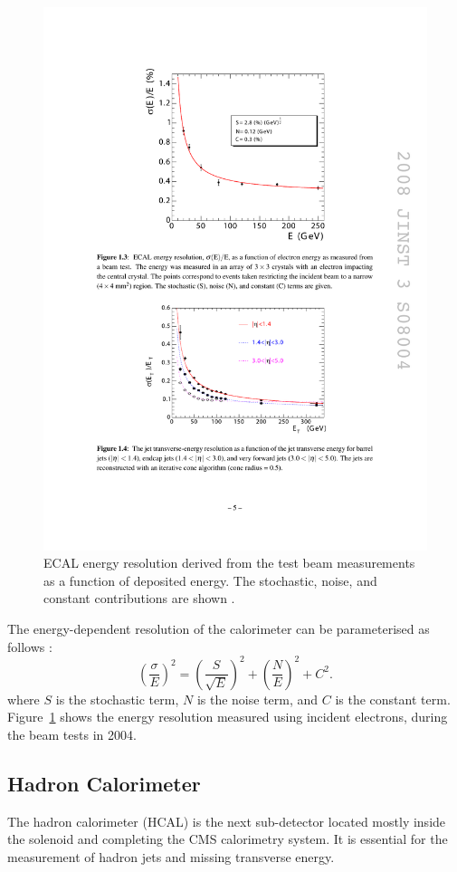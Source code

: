 \begin{figure}[htbp]
  \begin{center}
    \leavevmode
    \includegraphics[width=0.7\columnwidth]{ECAL_resolution}
    \caption{ECAL energy resolution derived from the test beam measurements as a function of deposited energy. The
    stochastic, noise, and constant contributions are shown \cite{CMS}.}
    \label{ECAL_resolution}
  \end{center}
\end{figure}

The energy-dependent resolution of the calorimeter can be parameterised as follows \cite{CMS}:
\begin{equation}
  \left(\frac{\sigma}{E}\right)^2 = \left(\frac{S}{\sqrt E}\right)^2 + \left(\frac{N}{E}\right)^2 + C^2.
\end{equation}
where $S$ is the stochastic term, $N$ is the noise term, and $C$ is the constant term. Figure~\ref{ECAL_resolution}
shows the energy resolution measured using incident electrons, during the beam tests in 2004.

\subsection{Hadron Calorimeter}

The hadron calorimeter (HCAL) is the next sub-detector located mostly inside the solenoid and completing the CMS
calorimetry system. It is essential for the measurement of hadron jets and missing transverse energy.

